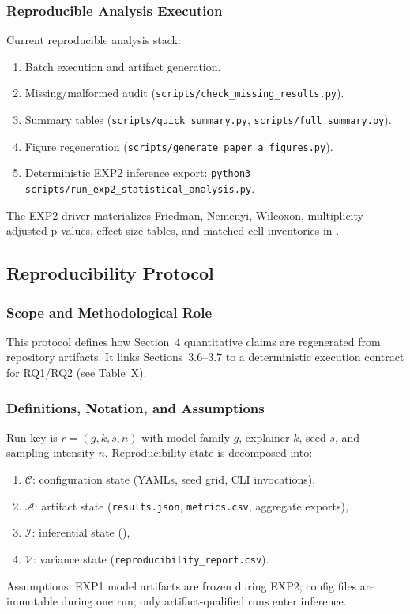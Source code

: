 \documentclass[twoside,11pt]{article}
\begin{document}
\subsubsection{Reproducible Analysis Execution}
Current reproducible analysis stack:
\begin{enumerate}[leftmargin=*]
    \item Batch execution and artifact generation.
    \item Missing/malformed audit (\texttt{scripts/check\_missing\_results.py}).
    \item Summary tables (\texttt{scripts/quick\_summary.py}, \texttt{scripts/full\_summary.py}).
    \item Figure regeneration (\texttt{scripts/generate\_paper\_a\_figures.py}).
    \item Deterministic EXP2 inference export:
    \texttt{python3 scripts/run\_exp2\_statistical\_analysis.py}.
\end{enumerate}
The EXP2 driver materializes Friedman, Nemenyi, Wilcoxon, multiplicity-adjusted
p-values, effect-size tables, and matched-cell inventories in
.

\subsection{Reproducibility Protocol}
\subsubsection{Scope and Methodological Role}
This protocol defines how Section~4 quantitative claims are regenerated from
repository artifacts. It links Sections~3.6--3.7 to a deterministic execution
contract for RQ1/RQ2 (see Table~X).

\subsubsection{Definitions, Notation, and Assumptions}
Run key is $r=(g,k,s,n)$ with model family $g$, explainer $k$, seed $s$, and
sampling intensity $n$.
Reproducibility state is decomposed into:
\begin{enumerate}[leftmargin=*]
    \item $\mathcal{C}$: configuration state (YAMLs, seed grid, CLI invocations),
    \item $\mathcal{A}$: artifact state (\texttt{results.json}, \texttt{metrics.csv}, aggregate exports),
    \item $\mathcal{I}$: inferential state (),
    \item $\mathcal{V}$: variance state (\texttt{reproducibility\_report.csv}).
\end{enumerate}
Assumptions: EXP1 model artifacts are frozen during EXP2; config files are
immutable during one run; only artifact-qualified runs enter inference.
\end{document}

